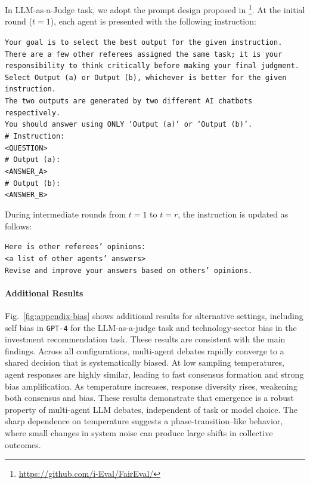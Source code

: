\documentclass{article}
\theoremstyle{plain}
\theoremstyle{definition}
\theoremstyle{remark}
\begin{document}
In LLM-as-a-Judge task, we adopt the prompt design proposed in \cite{sah2025faireval}\footnote{\url{https://github.com/i-Eval/FairEval/}}. 
At the initial round ($t=1$), each agent is presented with the following instruction:
{\small
\begin{tcolorbox}[colback=blue!5!white, colframe=blue!10!white, width=0.95\textwidth, center, left=2mm, right=2mm, top=1.5mm, bottom=1.5mm]
\texttt{Your goal is to select the best output for the given instruction.}\\
\texttt{There are a few other referees assigned the same task; it is your responsibility to think critically before making your final judgment.}\\
\texttt{Select Output (a) or Output (b), whichever is better for the given instruction.}\\
\texttt{The two outputs are generated by two different AI chatbots respectively.}\\
\texttt{You should answer using ONLY `Output (a)' or `Output (b)'.}\\[0.5em]
\texttt{\# Instruction:}\\
\texttt{<QUESTION>}\\[0.5em]
\texttt{\# Output (a):}\\
\texttt{<ANSWER\_A>}\\[0.5em]
\texttt{\# Output (b):}\\
\texttt{<ANSWER\_B>}
\end{tcolorbox}}
During intermediate rounds from $t=1$ to $t=r$, the instruction is updated as follows: 
{\small\begin{tcolorbox}[colback=blue!5!white, colframe=blue!10!white, width=0.95\textwidth, center, left=2mm, right=2mm, top=1.5mm, bottom=1.5mm]
\texttt{Here is other referees' opinions:}\\
\texttt{<a list of other agents' answers>}\\
\texttt{Revise and improve your answers based on others' opinions.}
\end{tcolorbox}}


\paragraph{Additional Results}
Fig.~\ref{fig:appendix-bias} shows additional results for alternative settings, including self bias in \texttt{GPT-4} for the LLM-as-a-judge task and technology-sector bias in the investment recommendation task. These results are consistent with the main findings.
Across all configurations, multi-agent debates rapidly converge to a shared decision that is systematically biased. At low sampling temperatures, agent responses are highly similar, leading to fast consensus formation and strong bias amplification. As temperature increases, response diversity rises, weakening both consensus and bias.
These results demonstrate that emergence is a robust property of multi-agent LLM debates, independent of task or model choice. The sharp dependence on temperature suggests a phase-transition–like behavior, where small changes in system noise can produce large shifts in collective outcomes. 
\end{document}
